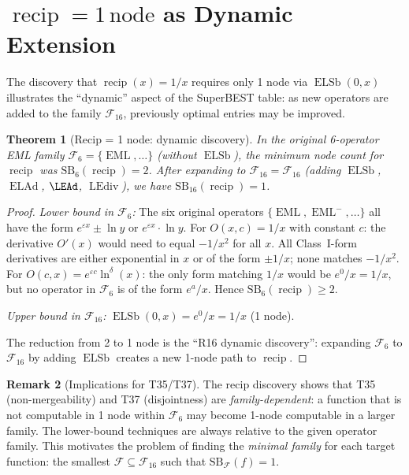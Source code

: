 \documentclass[12pt,a4paper]{article}
\newtheorem{theorem}{Theorem}[section]
\theoremstyle{definition}
\newtheorem{remark}[theorem]{Remark}
\newcommand{\EML}{\operatorname{EML}}
\newcommand{\ELAd}{\operatorname{ELAd}}
\newcommand{\ELSb}{\operatorname{ELSb}}
\newcommand{\LEdiv}{\operatorname{LEdiv}}
\newcommand{\F}{\mathcal{F}_{16}}
\newcommand{\SB}{\mathrm{SB}}
\newcommand{\recip}{\operatorname{recip}}
\begin{document}
\section{\texorpdfstring{$\recip = 1\,\text{node}$}{recip = 1 node}
  as Dynamic Extension}
\label{sec:recip}

The discovery that $\recip(x) = 1/x$ requires only 1 node via $\ELSb(0,x)$
illustrates the ``dynamic'' aspect of the SuperBEST table: as new operators
are added to the family $\F$, previously optimal entries may be improved.

\begin{theorem}[Recip = 1 node: dynamic discovery]
\label{thm:recip-dynamic}
In the original 6-operator EML family $\mathcal{F}_6 = \{\EML, \ldots\}$
(without $\ELSb$), the minimum node count for $\recip$ was $\SB_6(\recip) = 2$.
After expanding to $\F = \mathcal{F}_{16}$ (adding $\ELSb$, $\ELAd$, $\LEAd$, $\LEdiv$),
we have $\SB_{16}(\recip) = 1$.
\end{theorem}

\begin{proof}
\emph{Lower bound in $\mathcal{F}_6$:}
The six original operators $\{\EML, \EML^-, \ldots\}$ all have the form
$e^{\varepsilon x} \pm \ln y$ or $e^{\varepsilon x} \cdot \ln y$.
For $O(x,c) = 1/x$ with constant $c$:
the derivative $O'(x)$ would need to equal $-1/x^2$ for all $x$.
All Class~I-form derivatives are either exponential in $x$ or of the form
$\pm 1/x$; none matches $-1/x^2$.
For $O(c,x) = e^{\varepsilon c}\ln^{\delta}(x)$: the only form matching
$1/x$ would be $e^0 / x = 1/x$, but no operator in $\mathcal{F}_6$ is of the
form $e^a/x$.  Hence $\SB_6(\recip) \ge 2$.

\emph{Upper bound in $\mathcal{F}_{16}$:}
$\ELSb(0,x) = e^0/x = 1/x$ (1 node).

The reduction from 2 to 1 node is the ``R16 dynamic discovery'': expanding
$\mathcal{F}_6$ to $\mathcal{F}_{16}$ by adding $\ELSb$ creates a new 1-node
path to $\recip$.
\end{proof}

\begin{remark}[Implications for T35/T37]
The recip discovery shows that T35 (non-mergeability) and T37 (disjointness)
are \emph{family-dependent}: a function that is not computable in 1 node within
$\mathcal{F}_6$ may become 1-node computable in a larger family.  The
lower-bound techniques are always relative to the given operator family.
This motivates the problem of finding the \emph{minimal family} for each target
function: the smallest $\mathcal{F} \subseteq \mathcal{F}_{16}$ such that
$\SB_{\mathcal{F}}(f) = 1$.
\end{remark}
\end{document}

